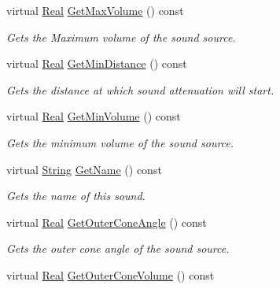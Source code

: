 \begin{DoxyCompactItemize}
virtual \hyperlink{namespaceMezzanine_a726731b1a7df72bf3583e4a97282c6f6}{Real} \hyperlink{classMezzanine_1_1Audio_1_1Sound_a86d99fee746dab624364f7f1104d08e8}{GetMaxVolume} () const 
\begin{DoxyCompactList}\small\item\em Gets the Maximum volume of the sound source. \item\end{DoxyCompactList}\item 
virtual \hyperlink{namespaceMezzanine_a726731b1a7df72bf3583e4a97282c6f6}{Real} \hyperlink{classMezzanine_1_1Audio_1_1Sound_a1907806223280339d63a484f9dc920b6}{GetMinDistance} () const 
\begin{DoxyCompactList}\small\item\em Gets the distance at which sound attenuation will start. \item\end{DoxyCompactList}\item 
virtual \hyperlink{namespaceMezzanine_a726731b1a7df72bf3583e4a97282c6f6}{Real} \hyperlink{classMezzanine_1_1Audio_1_1Sound_a3e62fe64d44d5c707f92c143a786b181}{GetMinVolume} () const 
\begin{DoxyCompactList}\small\item\em Gets the minimum volume of the sound source. \item\end{DoxyCompactList}\item 
virtual \hyperlink{namespaceMezzanine_acf9fcc130e6ebf08e3d8491aebcf1c86}{String} \hyperlink{classMezzanine_1_1Audio_1_1Sound_a42cf89caec563b8fe86ef65234f2badf}{GetName} () const 
\begin{DoxyCompactList}\small\item\em Gets the name of this sound. \item\end{DoxyCompactList}\item 
virtual \hyperlink{namespaceMezzanine_a726731b1a7df72bf3583e4a97282c6f6}{Real} \hyperlink{classMezzanine_1_1Audio_1_1Sound_a9dd34a98907ed664b1cb94992925d518}{GetOuterConeAngle} () const 
\begin{DoxyCompactList}\small\item\em Gets the outer cone angle of the sound source. \item\end{DoxyCompactList}\item 
virtual \hyperlink{namespaceMezzanine_a726731b1a7df72bf3583e4a97282c6f6}{Real} \hyperlink{classMezzanine_1_1Audio_1_1Sound_a9257d5e2a6233fda79a19a170f3f5533}{GetOuterConeVolume} () const 

\end{DoxyCompactItemize}
